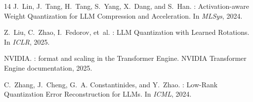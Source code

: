 \documentclass[11pt]{article}
\begin{document}
\begin{thebibliography}{14}
J.~Lin, J.~Tang, H.~Tang, S.~Yang, X.~Dang, and S.~Han.
: Activation-aware Weight Quantization for {LLM} Compression and
  Acceleration.
\newblock In {\em MLSys}, 2024.

Z.~Liu, C.~Zhao, I.~Fedorov, et~al.
: {LLM} Quantization with Learned Rotations.
\newblock In {\em ICLR}, 2025.

{NVIDIA}.
: format and scaling in the {Transformer Engine}.
\newblock NVIDIA Transformer Engine documentation, 2025.

C.~Zhang, J.~Cheng, G.~A. Constantinides, and Y.~Zhao.
: Low-Rank Quantization Error Reconstruction for {LLM}s.
\newblock In {\em ICML}, 2024.

\end{thebibliography}
\end{document}

